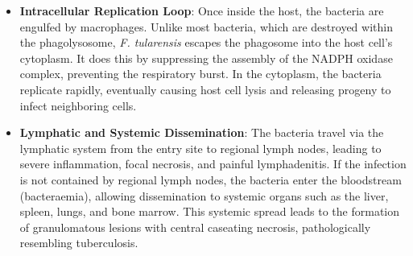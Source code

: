 \begin{itemize}
\begin{itemize}
        \item Domestic animal transmission: Scratches or bites from domestic cats that have hunted and killed infected rabbits or rodents.
    \end{itemize}
    \item \textbf{Intracellular Replication Loop}: Once inside the host, the bacteria are engulfed by macrophages. Unlike most bacteria, which are destroyed within the phagolysosome, \textit{F. tularensis} escapes the phagosome into the host cell's cytoplasm. It does this by suppressing the assembly of the NADPH oxidase complex, preventing the respiratory burst. In the cytoplasm, the bacteria replicate rapidly, eventually causing host cell lysis and releasing progeny to infect neighboring cells.
    \item \textbf{Lymphatic and Systemic Dissemination}: The bacteria travel via the lymphatic system from the entry site to regional lymph nodes, leading to severe inflammation, focal necrosis, and painful lymphadenitis. If the infection is not contained by regional lymph nodes, the bacteria enter the bloodstream (bacteraemia), allowing dissemination to systemic organs such as the liver, spleen, lungs, and bone marrow. This systemic spread leads to the formation of granulomatous lesions with central caseating necrosis, pathologically resembling tuberculosis.
\end{itemize}

